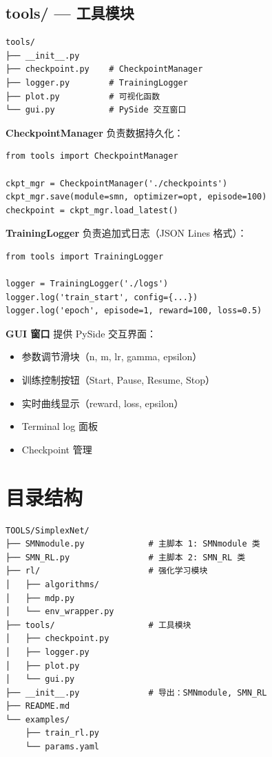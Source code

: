 \documentclass[11pt]{ctexart}
\begin{document}
\subsection{tools/ --- 工具模块}

\begin{framed}
\begin{verbatim}
tools/
├── __init__.py
├── checkpoint.py    # CheckpointManager
├── logger.py        # TrainingLogger
├── plot.py          # 可视化函数
└── gui.py           # PySide 交互窗口
\end{verbatim}
\end{framed}

\textbf{CheckpointManager} 负责数据持久化：
\begin{framed}
\begin{verbatim}
from tools import CheckpointManager

ckpt_mgr = CheckpointManager('./checkpoints')
ckpt_mgr.save(module=smn, optimizer=opt, episode=100)
checkpoint = ckpt_mgr.load_latest()
\end{verbatim}
\end{framed}

\textbf{TrainingLogger} 负责追加式日志（JSON Lines 格式）：
\begin{framed}
\begin{verbatim}
from tools import TrainingLogger

logger = TrainingLogger('./logs')
logger.log('train_start', config={...})
logger.log('epoch', episode=1, reward=100, loss=0.5)
\end{verbatim}
\end{framed}

\textbf{GUI 窗口} 提供 PySide 交互界面：
\begin{itemize}[leftmargin=2em]
  \item 参数调节滑块（n, m, lr, gamma, epsilon）
  \item 训练控制按钮（Start, Pause, Resume, Stop）
  \item 实时曲线显示（reward, loss, epsilon）
  \item Terminal log 面板
  \item Checkpoint 管理
\end{itemize}

\section{目录结构}

\begin{framed}
\begin{verbatim}
TOOLS/SimplexNet/
├── SMNmodule.py             # 主脚本 1: SMNmodule 类
├── SMN_RL.py                # 主脚本 2: SMN_RL 类
├── rl/                      # 强化学习模块
│   ├── algorithms/
│   ├── mdp.py
│   └── env_wrapper.py
├── tools/                   # 工具模块
│   ├── checkpoint.py
│   ├── logger.py
│   ├── plot.py
│   └── gui.py
├── __init__.py              # 导出：SMNmodule, SMN_RL
├── README.md
└── examples/
    ├── train_rl.py
    └── params.yaml
\end{verbatim}
\end{framed}
\end{document}
